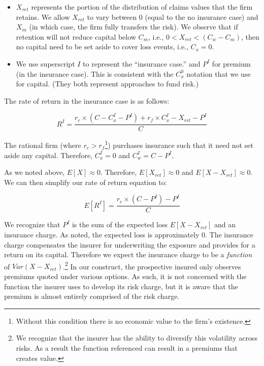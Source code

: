 \documentclass[
]{article}
\begin{document}
\begin{itemize}
\item
  \(X_{ret}\) represents the portion of the distribution of claims
  values that the firm retains. We allow \(X_{ret}\) to vary between 0
  (equal to the no insurance case) and \(X_m\) (in which case, the firm
  fully transfers the risk). We observe that if retention will not
  reduce capital below \(C_m\), i.e., \(0 < X_{ret} < (C_w - C_m)\),
  then no capital need to be set aside to cover loss events, i.e.,
  \(C_x = 0\).
\item
  We use superscript \(I\) to represent the ``insurance case.'' and
  \(P^{I}\) for premium (in the insurance case). This is consistent with
  the \(C_{x}^{0}\) notation that we use for capital. (They both
  represent approaches to fund risk.)
\end{itemize}

The rate of return in the insurance case is as follows:

\begin{equation}
R^I = \dfrac{r_c \times (C - C_{x}^{I} - P^{I}) + r_f \times C_{x}^{I} - X_{ret} - P^{I}}{C} \label{eqn:return-ins}
\end{equation}

The rational firm (where \(r_c > r_f\)\footnote{Without this condition
  there is no economic value to the firm's existence.}) purchases
insurance such that it need not set aside any capital. Therefore,
\(C_{x}^{I} = 0\) and \(C_{w}^{I} = C - P^{I}\).

As we noted above, \(E[X] \approx 0\). Therefore,
\(E[X_{ret}] \approx 0\) and \(E[X - X_{ret}] \approx 0\). We can then
simplify our rate of return equation to:

\begin{equation}
E[R^I] = \dfrac{r_c \times (C - P^{I}) - P^{I}}{C} \label{eqn:exp-return-ins}
\end{equation}

We recognize that \(P^{I}\) is the sum of the expected loss
\(E[X - X_{ret}]\) and an insurance charge. As noted, the expected loss
is approximately \(0\). The insurance charge compensates the insurer for
underwriting the exposure and provides for a return on its capital.
Therefore we expect the insurance charge to be a \emph{function} of
\(Var(X - X_{ret})\).\footnote{We recognize that the insurer has the
  ability to diversify this volatility across risks. As a result the
  function referenced can result in a premiums that creates value.} In
our construct, the prospective insured only observes premiums quoted
under various options. As such, it is not concerned with the function
the insurer uses to develop its risk charge, but it is aware that the
premium is almost entirely comprised of the risk charge.
\end{document}
